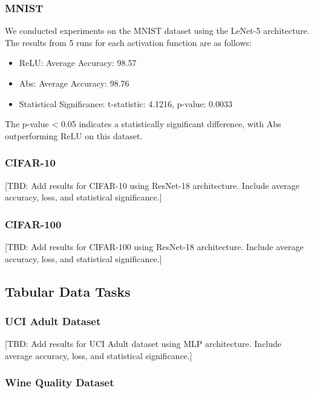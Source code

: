\documentclass[11pt]{article}
\begin{document}
\subsubsection{MNIST}

We conducted experiments on the MNIST dataset using the LeNet-5 architecture. The results from 5 runs for each activation function are as follows:

\begin{itemize}
\item ReLU: Average Accuracy: 98.57%
\item Abs: Average Accuracy: 98.76%
\item Statistical Significance: t-statistic: 4.1216, p-value: 0.0033
\end{itemize}

The p-value < 0.05 indicates a statistically significant difference, with Abs outperforming ReLU on this dataset.

\subsubsection{CIFAR-10}

[TBD: Add results for CIFAR-10 using ResNet-18 architecture. Include average accuracy, loss, and statistical significance.]

\subsubsection{CIFAR-100}

[TBD: Add results for CIFAR-100 using ResNet-18 architecture. Include average accuracy, loss, and statistical significance.]

\subsection{Tabular Data Tasks}

\subsubsection{UCI Adult Dataset}

[TBD: Add results for UCI Adult dataset using MLP architecture. Include average accuracy, loss, and statistical significance.]

\subsubsection{Wine Quality Dataset}
\end{document}
